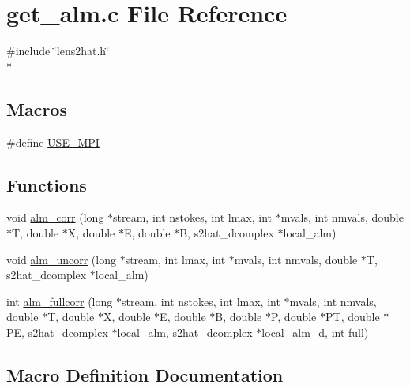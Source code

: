 \section{get\-\_\-alm.\-c File Reference}
\label{rng_2test__param__reader_2get__alm_8c}
{\ttfamily \#include \char`\"{}lens2hat.\-h\char`\"{}}\\*
\subsection*{Macros}
\begin{DoxyCompactItemize}
\item 
\#define \hyperlink{rng_2test__param__reader_2get__alm_8c_a3869d282031f6ea6b50fdb980b758420}{U\-S\-E\-\_\-\-M\-P\-I}
\end{DoxyCompactItemize}
\subsection*{Functions}
\begin{DoxyCompactItemize}
\item 
void \hyperlink{rng_2test__param__reader_2get__alm_8c_af7e9f4ce20a8335da38808a05d0f63ae}{alm\-\_\-corr} (long $\ast$stream, int nstokes, int lmax, int $\ast$mvals, int nmvals, double $\ast$T, double $\ast$X, double $\ast$E, double $\ast$B, s2hat\-\_\-dcomplex $\ast$local\-\_\-alm)
\item 
void \hyperlink{rng_2test__param__reader_2get__alm_8c_aa0789dcb4acd432d85d5c4882713444f}{alm\-\_\-uncorr} (long $\ast$stream, int lmax, int $\ast$mvals, int nmvals, double $\ast$T, s2hat\-\_\-dcomplex $\ast$local\-\_\-alm)
\item 
int \hyperlink{rng_2test__param__reader_2get__alm_8c_a66df8465f1ae10f3699210532ca527e1}{alm\-\_\-fullcorr} (long $\ast$stream, int nstokes, int lmax, int $\ast$mvals, int nmvals, double $\ast$T, double $\ast$X, double $\ast$E, double $\ast$B, double $\ast$P, double $\ast$P\-T, double $\ast$P\-E, s2hat\-\_\-dcomplex $\ast$local\-\_\-alm, s2hat\-\_\-dcomplex $\ast$local\-\_\-alm\-\_\-d, int full)
\end{DoxyCompactItemize}


\subsection{Macro Definition Documentation}
